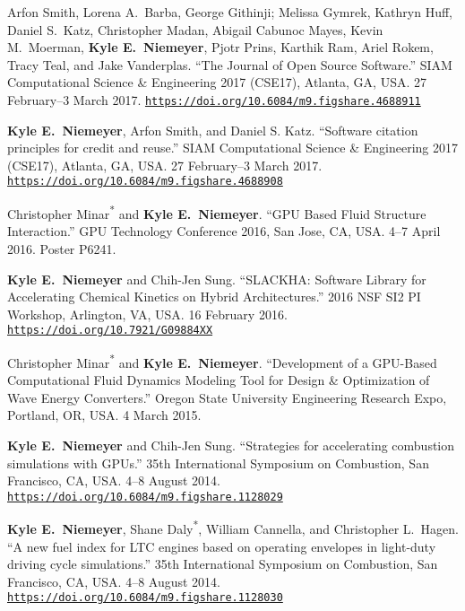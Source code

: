 \documentclass[margin,line,11pt]{res}
\makeatletter
\newlength{\bibhang}
\newlength{\bibsep}
 {\@listi \global\bibsep\itemsep \global\advance\bibsep by\parsep}
\newenvironment{bibenum*}
  {\renewcommand\labelenumi{\theenumi.}%
   \etaremune[
     topsep=0pt,
     itemsep=\bibsep,
     parsep=0pt,partopsep=0pt,
     itemindent=-\bibhang,
     leftmargin={\bibhang+\widthof{[999]}}]}
  {\endetaremune}
\newcommand*{\doi}[1]{\href{https://doi.org/#1}{\nolinkurl{https://doi.org/#1}}}
\makeatother
\begin{document}
\begin{resume}
\begin{bibenum*}

\item Arfon Smith, Lorena A.\ Barba, George Githinji; Melissa Gymrek, Kathryn Huff, Daniel S.\ Katz,
Christopher Madan, Abigail Cabunoc Mayes, Kevin M.\ Moerman, \textbf{Kyle E.~Niemeyer}, Pjotr Prins,
Karthik Ram, Ariel Rokem, Tracy Teal, and Jake Vanderplas.
``The Journal of Open Source Software.''
SIAM Computational Science \& Engineering 2017 (CSE17), Atlanta, GA, USA.
27 February--3 March 2017.
\doi{10.6084/m9.figshare.4688911}

\item \textbf{Kyle E.~Niemeyer}, Arfon Smith, and Daniel S. Katz.
``Software citation principles for credit and reuse.''
SIAM Computational Science \& Engineering 2017 (CSE17), Atlanta, GA, USA.
27 February--3 March 2017.
\doi{10.6084/m9.figshare.4688908}

\item Christopher Minar\textsuperscript{*} and \textbf{Kyle E.~Niemeyer}.
``GPU Based Fluid Structure Interaction.''
GPU Technology Conference 2016, San Jose, CA, USA.
4--7 April 2016.
Poster P6241.

\item \textbf{Kyle E.~Niemeyer} and Chih-Jen Sung.
``SLACKHA: Software Library for Accelerating Chemical Kinetics on Hybrid Architectures.'' 2016 NSF SI2 PI Workshop, Arlington, VA, USA.
16 February 2016.
\doi{10.7921/G09884XX}

\item Christopher Minar\textsuperscript{*} and \textbf{Kyle E.~Niemeyer}.
``Development of a GPU-Based Computational Fluid Dynamics Modeling Tool for Design \& Optimization of Wave Energy Converters.''
Oregon State University Engineering Research Expo, Portland, OR, USA.
4 March 2015.

\item \textbf{Kyle E.~Niemeyer} and Chih-Jen Sung.
``Strategies for accelerating combustion simulations with GPUs.''
35th International Symposium on Combustion, San Francisco, CA, USA.
4--8 August 2014.
\doi{10.6084/m9.figshare.1128029}

\item \textbf{Kyle E.~Niemeyer}, Shane Daly\textsuperscript{*}, William Cannella, and Christopher L.\ Hagen.
``A new fuel index for LTC engines based on operating envelopes in light-duty driving cycle simulations.''
35th International Symposium on Combustion, San Francisco, CA, USA.
4--8 August 2014.
\doi{10.6084/m9.figshare.1128030}


\end{bibenum*}
\end{resume}
\end{document}
